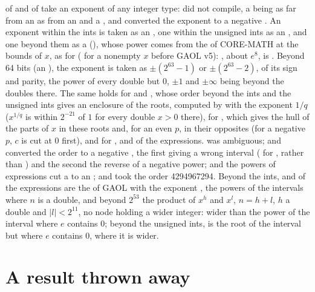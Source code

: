 \documentclass[12pt,a4paper,twoside,openright]{book}
\begin{document}
\medskip
{} of  and  of 
take an exponent of any integer type:  did not compile, a
 being as far from an  as from an  and a
, and  converted the exponent to a
negative . An exponent within the ints is taken as an ,
one within the unsigned ints as an , and one beyond them as a
 (), whose power comes from the
 of CORE-MATH at the bounds of $x$, as for 
(\itv{-\infty}{+\infty} for a nonempty $x$ before GAOL v5):
, about $e^8$, is
. Beyond 64 bits (an
), the exponent is taken as $\pm(2^{63}-1)$ or
$\pm(2^{63}-2)$, of its sign and parity, the power of every double but $0$,
$\pm 1$ and $\pm\infty$ being beyond the doubles there. The same holds for
 and , whose order beyond the ints and
the unsigned ints gives an enclosure of the roots, computed by  with
the exponent $1/q$ ($x^{1/q}$ is within $2^{-21}$ of $1$ for every double
$x>0$ there), for , which gives the hull of the parts
of $x$ in these roots and, for an even $p$, in their opposites (for a negative
$p$, $c$ is cut at 0 first), and for ,  and
 of the expressions.  was
ambiguous;  and 
converted the order to a negative , the first giving a wrong
interval ( for , rather than
) and the second the reverse of a negative
power;  and the powers of expressions cut a
 to an ; and  took the order
4294967294. Beyond the ints,  and  of the
expressions are the  of GAOL with the exponent , the
powers of the intervals where $n$ is a double, and beyond $2^{53}$ the
product of $x^h$ and $x^l$, $n=h+l$, $h$ a double and $|l|<2^{11}$, no node
holding a wider integer: wider than the power of the interval where $e$
contains 0; beyond the unsigned ints,  is the root of
the interval but where $e$ contains 0, where it is wider.

\section{A result thrown away}\label{sec:nodiscard}
%
\end{document}
